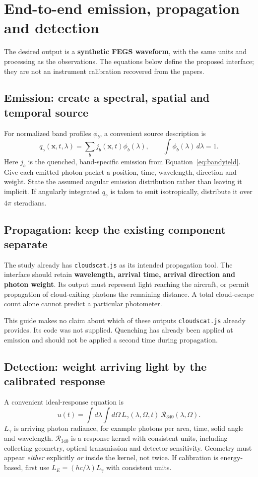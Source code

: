 \documentclass[11pt,a4paper]{article}
\newcommand{\nextsection}[1]{\clearpage\section{#1}}
\begin{document}
\nextsection{End-to-end emission, propagation and detection}
\label{sec:endtoend}
The desired output is a \textbf{synthetic FEGS waveform}, with the same units and processing as the observations. The equations below define the proposed interface; they are not an instrument calibration recovered from the papers.

\subsection*{Emission: create a spectral, spatial and temporal source}
For normalized band profiles $\phi_b$, a convenient source description is
\begin{equation}
 q_\gamma(\mathbf{x},t,\lambda)=\sum_b j_b(\mathbf{x},t)\phi_b(\lambda),
 \qquad \int \phi_b(\lambda)\,d\lambda=1.
 \label{eq:spectrum}
\end{equation}
Here $j_b$ is the quenched, band-specific emission from Equation~\eqref{eq:bandyield}. Give each emitted photon packet a position, time, wavelength, direction and weight. State the assumed angular emission distribution rather than leaving it implicit. If angularly integrated $q_\gamma$ is taken to emit isotropically, distribute it over $4\pi$ steradians.

\subsection*{Propagation: keep the existing component separate}
The study already has \texttt{cloudscat.js} as its intended propagation tool. The interface should retain \textbf{wavelength, arrival time, arrival direction and photon weight}. Its output must represent light reaching the aircraft, or permit propagation of cloud-exiting photons the remaining distance. A total cloud-escape count alone cannot predict a particular photometer.

This guide makes no claim about which of these outputs \texttt{cloudscat.js} already provides. Its code was not supplied. Quenching has already been applied at emission and should not be applied a second time during propagation.

\subsection*{Detection: weight arriving light by the calibrated response}
A convenient ideal-response equation is
\begin{equation}
 u(t)=\int d\lambda\int d\Omega\,
 L_\gamma(\lambda,\Omega,t)\,\mathcal{R}_{340}(\lambda,\Omega).
 \label{eq:response}
\end{equation}
$L_\gamma$ is arriving photon radiance, for example photons per area, time, solid angle and wavelength. $\mathcal{R}_{340}$ is a response kernel with consistent units, including collecting geometry, optical transmission and detector sensitivity. Geometry must appear \emph{either} explicitly \emph{or} inside the kernel, not twice. If calibration is energy-based, first use $L_E=(hc/\lambda)L_\gamma$ with consistent units.
\end{document}
